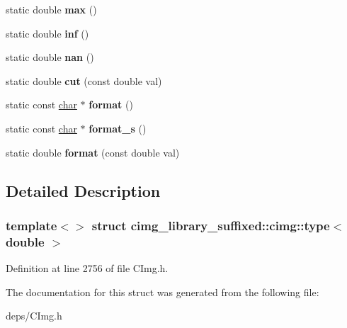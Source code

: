 \begin{DoxyCompactItemize}
static double {\bfseries max} ()
\item 
\mbox{\label{structcimg__library__suffixed_1_1cimg_1_1type_3_01double_01_4_a88a6e089caf31174bfec6bbb2dd57a59}} 
static double {\bfseries inf} ()
\item 
\mbox{\label{structcimg__library__suffixed_1_1cimg_1_1type_3_01double_01_4_ae3c33f103b0328e4455c88a36bdccdcc}} 
static double {\bfseries nan} ()
\item 
\mbox{\label{structcimg__library__suffixed_1_1cimg_1_1type_3_01double_01_4_abf5f41dd5c703d266cf9458d48a32a9d}} 
static double {\bfseries cut} (const double val)
\item 
\mbox{\label{structcimg__library__suffixed_1_1cimg_1_1type_3_01double_01_4_aa791574f1d99dc5eace19fe3086c1402}} 
static const \hyperlink{classchar}{char} $\ast$ {\bfseries format} ()
\item 
\mbox{\label{structcimg__library__suffixed_1_1cimg_1_1type_3_01double_01_4_ab2168dd6fc34413f513aa9f827b71e51}} 
static const \hyperlink{classchar}{char} $\ast$ {\bfseries format\+\_\+s} ()
\item 
\mbox{\label{structcimg__library__suffixed_1_1cimg_1_1type_3_01double_01_4_a8bd5d41d007cebb8f80b154f38d010f1}} 
static double {\bfseries format} (const double val)
\end{DoxyCompactItemize}


\subsection{Detailed Description}
\subsubsection*{template$<$$>$\newline
struct cimg\+\_\+library\+\_\+suffixed\+::cimg\+::type$<$ double $>$}



Definition at line 2756 of file C\+Img.\+h.



The documentation for this struct was generated from the following file\+:\begin{DoxyCompactItemize}
\item 
deps/C\+Img.\+h\end{DoxyCompactItemize}
